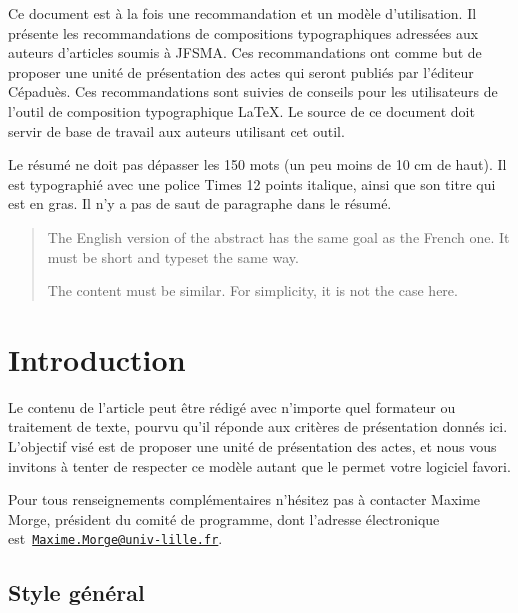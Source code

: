 \documentclass[demonstration]{jfsma}
\begin{document}
\maketitle

\begin{resume}
  Ce document est à la fois une recommandation et un modèle d'utilisation. Il
  présente les recommandations de compositions typographiques adressées aux
  auteurs d'articles soumis à JFSMA. Ces recommandations ont comme but de
  proposer une unité de présentation des actes qui seront publiés par l'éditeur
  Cépaduès. Ces recommandations sont suivies de conseils pour les utilisateurs
  de l'outil de composition typographique \LaTeX. Le source de ce document doit
  servir de base de travail aux auteurs utilisant cet outil.

  Le résumé ne doit pas dépasser les 150 mots (un peu moins de 10 cm de haut).
  Il est typographié avec une police Times 12 points italique, ainsi que son titre qui
  est en gras. Il n'y a pas de saut de paragraphe dans le résumé.
\end{resume}


\bigskip

\begin{abstract}
  The English version of the abstract has the same goal as the French one. It
  must be short and typeset the same way.


  The content must be similar. For simplicity, it is not the case here.
\end{abstract}

\section{Introduction}

Le contenu de l'article peut être rédigé avec n'importe quel formateur ou
traitement de texte, pourvu qu'il réponde aux critères de présentation donnés
ici. L'objectif visé est de proposer une unité de présentation des actes, et
nous vous invitons à tenter de respecter ce modèle autant que le permet votre
logiciel favori.

Pour tous renseignements complémentaires n'hésitez pas à contacter Maxime Morge,
président du comité de programme, dont l'adresse électronique
est~\texttt{\href{mailto:Maxime.Morge@univ-lille.fr}{Maxime.Morge@univ-lille.fr}}.

\subsection{Style général}
\end{document}

